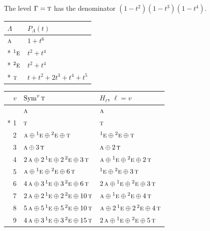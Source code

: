 \documentclass[10pt,a4paper]{article}
\numberwithin{equation}{section}
\newcommand{\irr}[1]{\text{\normalfont\scshape #1}}
\newcommand{\conjpair}[1]{{}^{#1}}
\begin{document}
The level $\Gamma = \irr{t}$ has the denominator $(1-t^{2})(1-t^{3})(1-t^{4})$.
{\small\begin{longtable}{@{}ll@{}}\toprule
$\Lambda$ & $P_\Lambda(t)$\\\midrule\endhead
\bottomrule\endfoot\endlastfoot
$\irr{a}$ & $1 + t^{6}$\\*
$\conjpair{1}\irr{e}$ & $t^{2} + t^{4}$\\*
$\conjpair{2}\irr{e}$ & $t^{2} + t^{4}$\\*
$\irr{t}$ & $t + t^{2} + 2t^{3} + t^{4} + t^{5}$\\
\bottomrule\end{longtable}}
{\small\begin{longtable}{@{}rll@{}}\toprule
$v$ & $\operatorname{Sym}^{v}\irr{t}$ & $H_\ell$, $\ell = v$\\\midrule\endhead
\bottomrule\endfoot\endlastfoot
0 & $\irr{a}$ & $\irr{a}$\\*
1 & $\irr{t}$ & $\irr{t}$\\
2 & $\irr{a} \oplus \conjpair{1}\irr{e} \oplus \conjpair{2}\irr{e} \oplus \irr{t}$ & $\conjpair{1}\irr{e} \oplus \conjpair{2}\irr{e} \oplus \irr{t}$\\
3 & $\irr{a} \oplus 3\,\irr{t}$ & $\irr{a} \oplus 2\,\irr{t}$\\
4 & $2\,\irr{a} \oplus 2\,\conjpair{1}\irr{e} \oplus 2\,\conjpair{2}\irr{e} \oplus 3\,\irr{t}$ & $\irr{a} \oplus \conjpair{1}\irr{e} \oplus \conjpair{2}\irr{e} \oplus 2\,\irr{t}$\\
5 & $\irr{a} \oplus \conjpair{1}\irr{e} \oplus \conjpair{2}\irr{e} \oplus 6\,\irr{t}$ & $\conjpair{1}\irr{e} \oplus \conjpair{2}\irr{e} \oplus 3\,\irr{t}$\\
6 & $4\,\irr{a} \oplus 3\,\conjpair{1}\irr{e} \oplus 3\,\conjpair{2}\irr{e} \oplus 6\,\irr{t}$ & $2\,\irr{a} \oplus \conjpair{1}\irr{e} \oplus \conjpair{2}\irr{e} \oplus 3\,\irr{t}$\\
7 & $2\,\irr{a} \oplus 2\,\conjpair{1}\irr{e} \oplus 2\,\conjpair{2}\irr{e} \oplus 10\,\irr{t}$ & $\irr{a} \oplus \conjpair{1}\irr{e} \oplus \conjpair{2}\irr{e} \oplus 4\,\irr{t}$\\
8 & $5\,\irr{a} \oplus 5\,\conjpair{1}\irr{e} \oplus 5\,\conjpair{2}\irr{e} \oplus 10\,\irr{t}$ & $\irr{a} \oplus 2\,\conjpair{1}\irr{e} \oplus 2\,\conjpair{2}\irr{e} \oplus 4\,\irr{t}$\\
9 & $4\,\irr{a} \oplus 3\,\conjpair{1}\irr{e} \oplus 3\,\conjpair{2}\irr{e} \oplus 15\,\irr{t}$ & $2\,\irr{a} \oplus \conjpair{1}\irr{e} \oplus \conjpair{2}\irr{e} \oplus 5\,\irr{t}$\\

\end{longtable}}
\end{document}
